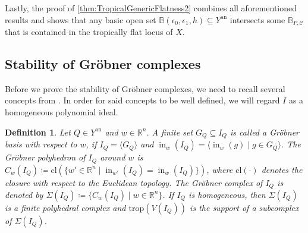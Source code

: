 \documentclass[12pt,reqno,a4paper]{amsart}
\theoremstyle{theoremstyle}
\theoremstyle{examplestyle}
\newtheorem{definition}[theorem]{Definition}
\theoremstyle{algorithmstyle}
\newcommand{\RR}{\mathbb{R}}
\newcommand{\an}{{\mathrm{an}}}
\DeclareMathOperator{\initial}{in}
\begin{document}
Lastly, the proof of \cref{thm:TropicalGenericFlatness2} combines all aforementioned results and shows that any basic open set $\mathbb{B}(\epsilon_{0},\epsilon_{1},h)\subseteq Y^{\an}$ intersects some $\mathbb{B}_{P,\mathcal C}$ that is contained in the tropically flat locus of $X$. %

\subsection*{Stability of Gr\"obner complexes}
Before we prove the stability of Gr\"obner complexes, we need to recall several concepts from \cite[Section 2.4 and 2.5]{MS15}.  In order for said concepts to be well defined, we will regard $I$ as a homogeneous polynomial ideal.

\begin{definition}
  Let $Q\in Y^{\mathrm{an}}$ and $w\in\RR^n$.
  A finite set $G_Q\subseteq I_Q$ is called a \emph{Gr\"obner basis} with respect to $w$, if $I_Q=\langle G_Q\rangle$ and $\initial_w(I_Q)=\langle \initial_w(g)\mid g\in G_Q\rangle$.
  The \emph{Gr\"obner polyhedron} of $I_Q$ around $w$ is $C_w(I_Q) \coloneqq \mathrm{cl}(\{w'\in\RR^n\mid\initial_{w'}(I_Q)=\initial_w(I_Q)\})$, where $\mathrm{cl}(\cdot)$ denotes the closure with respect to the Euclidean topology. The \emph{Gr\"obner complex} of $I_Q$ is denoted by $\Sigma(I_Q)\coloneqq\{C_w(I_Q)\mid w\in\RR^n \}$. If $I_Q$ is homogeneous, then $\Sigma(I_Q)$ is a finite polyhedral complex and $\mathrm{trop}(V(I_Q))$ is the support of a subcomplex of $\Sigma(I_Q)$.
\end{definition}
\end{document}
